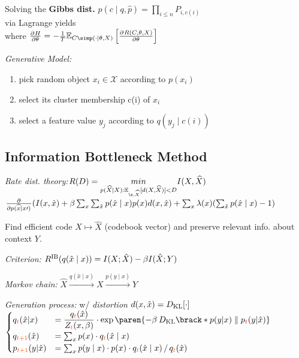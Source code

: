 Solving the \textbf{Gibbs dist.} $p(c \mid q, \hat p) = \prod_{i\leq n} P_{i, c(i)}$\\
via Lagrange yields 
{\color{gray}\scriptsize {}}\\
where $\pderiv{H}{\theta} = - \frac1T \mathbb{E}_{C\simp(\cdot\mid\theta, X)}\left[\pderiv{R(C,\theta, X)}{\theta}\right]$

\emph{Generative Model:}
\begin{enumerate}
    \item pick random object $x_i\in\mathcal{X}$ according to $p(x_i)$
    \item select its cluster membership c(i) of $x_i$
    \item select a feature value $y_j$ according to $q(y_j\mid c(i))$
\end{enumerate}
\subsection{Information Bottleneck Method}
\emph{Rate dist. theory:}\enskip $R(D)=\underset{p(\widehat{X}\mid X): \mathbb{E}_{\x,\widehat{X}}[d(X,\widehat{X})]<D}{min}I(X, \widehat{X})$\\
$\pderiv{}{p(\widehat{x}\mid x\prime)}(I(x, \hat{x})+\beta\sum_x\sum_{\hat{x}}p(\hat{x}\mid x)p(x)d(x,\hat{x}) \newline +\sum_x\lambda(x)(\sum_{\hat{x}}p(\hat{x}\mid x)-1)$

Find efficient code $X \mapsto \hat X$ (codebook vector) and preserve relevant info. about context $Y$.

\emph{Criterion:}\enskip
$R^\mathrm{IB}(q(\hat x\mid x)) = I(X; \hat X) - \beta I(\hat X; Y)$

\emph{Markov chain:}\enskip
$\hat X \xrightarrow{q(\hat x\mid x)} X \xrightarrow{p(y\mid x)} Y$

\emph{Generation process:}\enskip
w/ \textit{distortion} $d(x,\hat x) = D_\mathrm{KL}[\cdot]$\\
$\begin{cases}\begin{matrix*}[l]
    q_{\color{OrangeRed} t}(\hat x\vert x) &
        = \dfrac{q_{\color{OrangeRed} t}(\hat x)}{Z_{\color{OrangeRed} t}(x, \beta)} \cdot \exp\paren{ -\beta \: D\ped{KL}\brack*{p(y\vert x) \parallel p_{\color{red} t}(y\vert \hat x)} }
    \\
    q_{\color{OrangeRed} t{+}1}(\hat x) &
        = \sum_x p(x) \cdot q_{\color{OrangeRed} t}(\hat x \mid x)
    \\
    p_{\color{OrangeRed} t{+}1}(y\vert \hat x) &
        = \sum_{x} p(y\mid x) \cdot p(x) \cdot q_{\color{OrangeRed} t}(\hat x\mid x) \,/\, q_{\color{OrangeRed} t}(\hat x)
\end{matrix*}\end{cases}$



